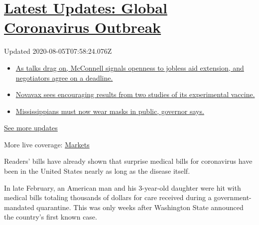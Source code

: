 \hypertarget{latest-updates-global-coronavirus-outbreak}{%
\section{\texorpdfstring{\href{https://www.nytimes.com/2020/08/04/world/coronavirus-cases.html?action=click\&pgtype=Article\&state=default\&region=MAIN_CONTENT_1\&context=storylines_live_updates}{Latest
Updates: Global Coronavirus
Outbreak}}{Latest Updates: Global Coronavirus Outbreak}}\label{latest-updates-global-coronavirus-outbreak}}

Updated 2020-08-05T07:58:24.076Z

\begin{itemize}
\tightlist
\item
  \href{https://www.nytimes.com/2020/08/04/world/coronavirus-cases.html?action=click\&pgtype=Article\&state=default\&region=MAIN_CONTENT_1\&context=storylines_live_updates\#link-762df92}{As
  talks drag on, McConnell signals openness to jobless aid extension,
  and negotiators agree on a deadline.}
\item
  \href{https://www.nytimes.com/2020/08/04/world/coronavirus-cases.html?action=click\&pgtype=Article\&state=default\&region=MAIN_CONTENT_1\&context=storylines_live_updates\#link-1228a480}{Novavax
  sees encouraging results from two studies of its experimental
  vaccine.}
\item
  \href{https://www.nytimes.com/2020/08/04/world/coronavirus-cases.html?action=click\&pgtype=Article\&state=default\&region=MAIN_CONTENT_1\&context=storylines_live_updates\#link-794484ed}{Mississippians
  must now wear masks in public, governor says.}
\end{itemize}

\href{https://www.nytimes.com/2020/08/04/world/coronavirus-cases.html?action=click\&pgtype=Article\&state=default\&region=MAIN_CONTENT_1\&context=storylines_live_updates}{See
more updates}

More live coverage:
\href{https://www.nytimes.com/live/2020/08/04/business/stock-market-today-coronavirus?action=click\&pgtype=Article\&state=default\&region=MAIN_CONTENT_1\&context=storylines_live_updates}{Markets}

Readers' bills have already shown that surprise medical bills for
coronavirus have been in the United States nearly as long as the disease
itself.

In late February, an American man and his 3-year-old daughter were hit
with medical bills totaling thousands of dollars for care received
during a government-mandated quarantine. This was only weeks after
Washington State announced the country's first known case.

